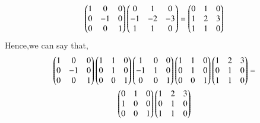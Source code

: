 \documentclass[journal,12pt,twocolumn]{IEEEtran}
\begin{document}
 \begin{align}
   \begin{pmatrix}1&0&0\\0&-1&0\\0&0&1\end{pmatrix} \begin{pmatrix}0&1&0\\-1&-2&-3\\1&1&0\end{pmatrix}=
\begin{pmatrix}0&1&0\\1&2&3\\1&1&0\end{pmatrix}
 \end{align}
 Hence,we can say that,
\begin{multline}
  \begin{pmatrix}1&0&0\\0&-1&0\\0&0&1\end{pmatrix} \begin{pmatrix}1&1&0\\0&1&0\\0&0&1\end{pmatrix}\begin{pmatrix}1&0&0\\-1&1&0\\0&0&1\end{pmatrix}\begin{pmatrix}1&1&0\\0&1&0\\0&0&1\end{pmatrix}\begin{pmatrix}1&2&3\\0&1&0\\1&1&0\end{pmatrix}=\\ \begin{pmatrix}0&1&0\\1&0&0\\0&0&1\end{pmatrix}\begin{pmatrix}1&2&3\\0&1&0\\1&1&0\end{pmatrix}
 \end{multline}
  
\end{document}
